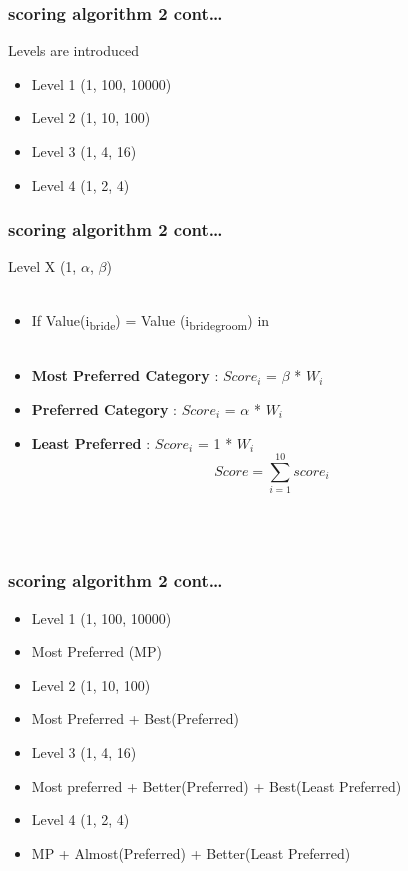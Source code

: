 \documentclass[10pt, compress]{beamer}
\begin{document}
\begin{frame}[fragile]
  \frametitle{scoring algorithm 2 cont\ldots}
  \alert{Levels are introduced}
  \begin{itemize}
\item<1> Level 1 (1, 100, 10000)
\item<1> Level 2 (1, 10, 100)
\item<1> Level 3 (1, 4, 16)
\item<1> Level 4 (1, 2, 4)

 \end{itemize}
\end{frame}

\begin{frame}[fragile]
  \frametitle{scoring algorithm 2 cont\ldots}
  Level  X (1, $\alpha$, $\beta$)\\~\
\begin{itemize}
\item<1>  If Value(i\textsubscript{bride}) = Value (i\textsubscript{bridegroom}) in\\~\
\item<1> \textbf{Most Preferred Category} : $ Score_i$ = $\beta$ * $W_i$ 
\item<1> \textbf{Preferred Category} : $ Score_i$ = $\alpha$ * $W_i$
\item<1> \textbf{Least Preferred} : $ Score_i$ = 1 * $W_i$
\begin{equation*}
    Score = \sum_{i=1}^{10} score_i
  \end{equation*}
\end{itemize}\\~\

\end{frame}

\begin{frame}[fragile]
  \frametitle{scoring algorithm 2 cont\ldots}
  \begin{itemize}
  \item<1>\alert{ Level 1 (1, 100, 10000)}
 \item<1> Most Preferred (MP)
 \item<1> \alert{ Level 2 (1, 10, 100)}
 \item<1> Most Preferred + Best(Preferred)
 \item<1> \alert{ Level 3 (1, 4, 16)}
 \item<1>Most preferred + Better(Preferred) + Best(Least Preferred)
 \item<1> \alert{ Level 4 (1, 2, 4)}
 \item<1> MP + Almost(Preferred) + Better(Least Preferred)
 
 
 \end{itemize}
\end{frame}
\end{document}
